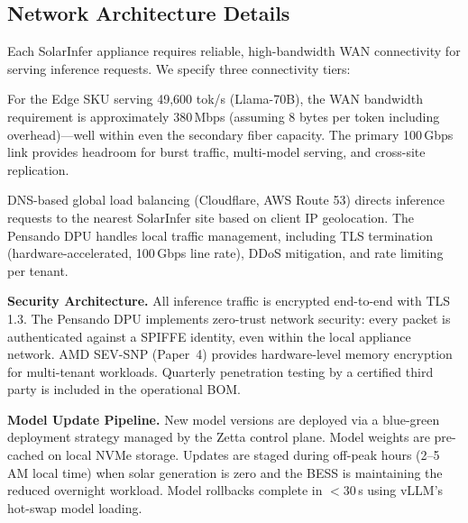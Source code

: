 \documentclass[conference,10pt,letterpaper]{IEEEtran}
\begin{document}
\subsection{Network Architecture Details}

Each SolarInfer appliance requires reliable, high-bandwidth WAN connectivity for serving inference requests. We specify three connectivity tiers:

\begin{table}[!t]
\caption{WAN Connectivity Options}
\label{tab:wan}
\centering\scriptsize
{}
\end{table}

For the Edge SKU serving 49,600 tok/s (Llama-70B), the WAN bandwidth requirement is approximately 380\,Mbps (assuming 8 bytes per token including overhead)---well within even the secondary fiber capacity. The primary 100\,Gbps link provides headroom for burst traffic, multi-model serving, and cross-site replication.

DNS-based global load balancing (Cloudflare, AWS Route 53) directs inference requests to the nearest SolarInfer site based on client IP geolocation. The Pensando DPU handles local traffic management, including TLS termination (hardware-accelerated, 100\,Gbps line rate), DDoS mitigation, and rate limiting per tenant.

\textbf{Security Architecture.} All inference traffic is encrypted end-to-end with TLS 1.3. The Pensando DPU implements zero-trust network security: every packet is authenticated against a SPIFFE identity, even within the local appliance network. AMD SEV-SNP (Paper~4) provides hardware-level memory encryption for multi-tenant workloads. Quarterly penetration testing by a certified third party is included in the operational BOM.

\textbf{Model Update Pipeline.} New model versions are deployed via a blue-green deployment strategy managed by the Zetta control plane. Model weights are pre-cached on local NVMe storage. Updates are staged during off-peak hours (2--5 AM local time) when solar generation is zero and the BESS is maintaining the reduced overnight workload. Model rollbacks complete in $<$30\,s using vLLM's hot-swap model loading.
\end{document}
